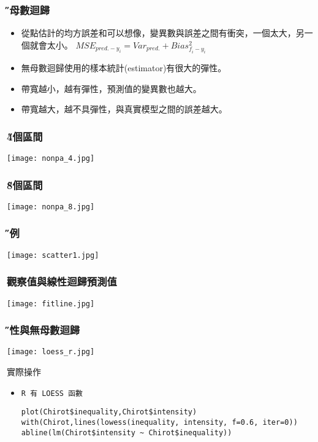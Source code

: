 \documentclass[xcolor=dvipsnames]{beamer}
\begin{document}
\begin{frame}\frametitle{\H 無母數迴歸}
\begin{itemize}
\item 從點估計的均方誤差和可以想像，變異數與誤差之間有衝突，一個太大，另一個就會太小。
$MSE_{pred.-y_{i}}=Var_{pred.}+Bias_{\mathit{f_{i}}-y_{i}}^2$
\medskip

\item 無母數迴歸使用的樣本統計(estimator)有很大的彈性。\item 帶寬越小，越有彈性，預測值的變異數也越大。
\item 帶寬越大，越不具彈性，與真實模型之間的誤差越大。
\end{itemize}
\end{frame}
\begin{frame}\frametitle{\H 4個區間}
\begin{center}
\texttt{[image: nonpa\_4.jpg]} 
\end{center}
\end{frame}
\begin{frame}\frametitle{\H 8個區間}
\begin{center}
\texttt{[image: nonpa\_8.jpg]} 
\end{center}
\end{frame}
\begin{frame}\frametitle{\H 實例}
\begin{center}
\texttt{[image: scatter1.jpg]} 
\end{center}
\end{frame}
\begin{frame}\frametitle{觀察值與線性迴歸預測值}
\begin{center}
\texttt{[image: fitline.jpg]} 
\end{center}
\end{frame}
\begin{frame}\frametitle{\H 線性與無母數迴歸}
\begin{center}
\texttt{[image: loess\_r.jpg]} 
\end{center}
\end{frame}
\begin{frame}[fragile=singleslide]{實際操作}
\begin{itemize}
\item \tt{R} 有 \tt{LOESS} 函數
\bigskip
\begin{Verbatim}[frame=single,label=R code,
fontseries=b,xleftmargin=2mm,commandchars=\\\{\},
formatcom=\color{blue}]
plot(Chirot$inequality,Chirot$intensity)
with(Chirot,lines(lowess(inequality, intensity, f=0.6, iter=0))
abline(lm(Chirot$intensity ~ Chirot$inequality))
\end{Verbatim}
\end{itemize}
\end{frame}
\end{document}
